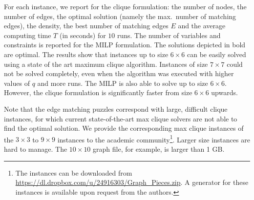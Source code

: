 \documentclass[preprint,12pt]{elsarticle}
\begin{document}
{\begin{table}
	\label{tab:cliqueResults}
\end{table}
For each instance, we report for the clique formulation: the number of nodes, the number of edges, the optimal solution (namely the max.~number of matching edges), the density, the best number of matching edges $E$ and the average computing time $T$ (in seconds) for $10$ runs.
The number of variables and constraints is reported for the MILP formulation. 
The solutions depicted in bold are optimal.
The results show that instances up to size $6\times6$ can be easily solved using a state of the art maximum clique algorithm. 
Instances of size $7\times7$ could not be solved completely, even when the algorithm was executed with higher values of $q$ and more runs.
The MILP is also able to solve up to size $6\times6$. However, the clique formulation is significantly faster from size $6\times 6$ upwards.

Note that the edge matching puzzles correspond with large, difficult clique instances, for which current state-of-the-art max clique solvers are not able to find the optimal solution.
We provide the corresponding max clique instances of the $3\times3$ to $9\times9$ instances to the academic community\footnote{The instances can be downloaded from \url{https://dl.dropbox.com/u/24916303/Graph_Pieces.zip}. A generator for these instances is available upon request from the authors.}. Larger size instances are hard to manage. The $10\times10$ graph file, for example, is larger than 1 GB.




}
\end{document}
